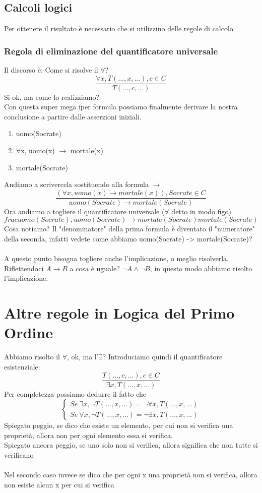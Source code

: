 \documentclass[12pt, a4paper, openany, oneside]{book}
\begin{document}
{\subsection{Calcoli logici}
Per ottenere il risultato è necessario che si utilizzino delle regole di
calcolo %
\subsubsection{Regola di eliminazione del quantificatore universale}
Il discorso è: Come si risolve il $\forall$?
$$\frac{\forall x, T(..., x, ...), c\in C}{T(..., c, ...)} $$
Si ok, ma come lo realizziamo?  \\ 
Con questa super mega iper formula possiamo finalmente derivare la nostra
conclusione a partire dalle asserzioni iniziali. 
\begin{enumerate}
	\item uomo(Socrate)
	\item $\forall$x, uomo(x) $\to$ mortale(x)
	\item mortale(Socrate)
\end{enumerate}
Andiamo a scrivercela sostituendo alla formula $\to$
$$\frac{(\forall x, uomo(x) \to mortale(x)), Socrate\in C}{uomo(Socrate)\to 
mortale(Socrate)}$$
Ora andiamo a togliere il quantificatore universale ($\forall$ detto in modo figo)
$$frac{uomo(Socrate), uomo(Socrate) \to mortale(Socrate)}{mortale(Socrate)}$$
Cosa notiamo? Il "denominatore" della prima formula è diventato il "numeratore"
della seconda, infatti vedete come abbiamo uomo(Socrate) -> mortale(Socrate)?
\\ \\
A questo punto bisogna togliere anche l'implicazione, o meglio risolverla. 
Riflettendoci $A \to B$ a cosa è uguale? $\neg A \wedge \neg B$, in questo
modo abbiamo risolto l'implicazione.
\section{Altre regole in Logica del Primo Ordine}
Abbiamo risolto il $\forall$, ok, ma l'$\exists$?
Introduciamo quindi il quantificatore esistenziale:
$$\frac{T(..., c, ...), c\in C}{\exists x, T(..., x, ...)}$$
Per completezza possiamo dedurre il fatto che 
$$
\begin{cases}
Se ~ \exists x, \neg T(..., x, ...) = \neg \forall x, T(..., x, ...) \\
Se ~ \forall x, \neg T(..., x, ...) = \neg \exists x, T(..., x, ...)
\end{cases}$$
Spiegato peggio, se dico che esiste un elemento, per cui non si verifica una 
proprietà, allora non per ogni elemento essa si verifica. \\ 
Spiegato ancora peggio, se uno solo non si verifica, allora significa che non 
tutte si verificano \\ \\
Nel secondo caso invece se dico che per ogni x una proprietà non si verifica,
allora non esiste alcun x per cui si verifica 
}
\end{document}
